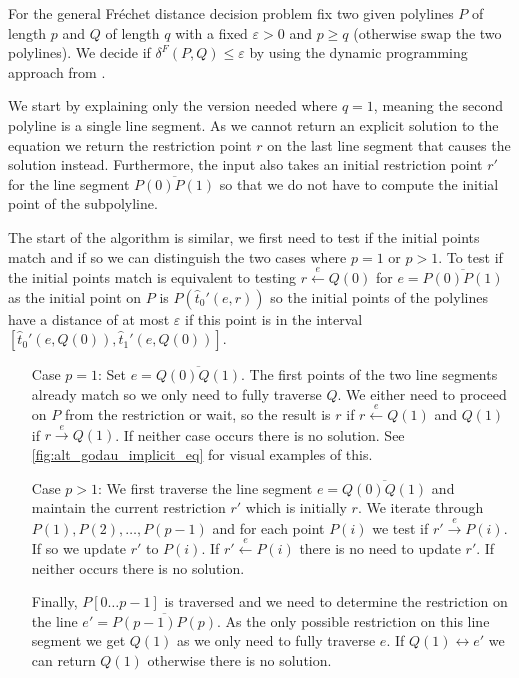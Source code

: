For the general Fréchet distance decision problem fix two given polylines \(P\) of length \(p\) and \(Q\) of length \(q\) with a fixed \(\varepsilon > 0\) and \(p \geq q\) (otherwise swap the two polylines). We decide if \(\delta^F(P, Q) \leq \varepsilon\) by using the dynamic programming approach from \citeauthor{computing_the_frechet_distance_between_two_polygonal_curves}. 

We start by explaining only the version needed where \(q = 1\), meaning the second polyline is a single line segment. As we cannot return an explicit solution to the equation we return the restriction point \(r\) on the last line segment that causes the solution instead. Furthermore, the input also takes an initial restriction point \(r'\) for the line segment \(\overline{P(0)P(1)}\) so that we do not have to compute the initial point of the subpolyline. 

The start of the algorithm is similar, we first need to test if the initial points match and if so we can distinguish the two cases where \(p = 1\) or \(p > 1\). To test if the initial points match is equivalent to testing \(r \overset e\leftarrow Q(0)\) for \(e = \overline{P(0)P(1)}\) as the initial point on \(P\) is \(P(\hat t_0'(e, r))\) so the initial points of the polylines have a distance of at most \(\varepsilon\) if this point is in the interval \([\hat t_0'(e, Q(0)), \hat t_1'(e, Q(0))]\).

\begin{itemize}
  \item[Case \(p = 1\): ] Set \(e = \overline{Q(0)Q(1)}\). The first points of the two line segments already match so we only need to fully traverse \(Q\). We either need to proceed on \(P\) from the restriction or wait, so the result is \(r\) if \(r \overset e\leftarrow Q(1)\) and \(Q(1)\) if \(r \overset e\rightarrow Q(1)\). If neither case occurs there is no solution. 
    See \cref{fig:alt_godau_implicit_eq} for visual examples of this.
  \item[Case \(p > 1\): ] We first traverse the line segment \(e = \overline{Q(0)Q(1)}\) and maintain the current restriction \(r'\) which is initially \(r\). We iterate through \(P(1), P(2), \dots, P(p-1)\) and for each point \(P(i)\) we test if \(r' \overset e\rightarrow P(i)\). If so we update \(r'\) to \(P(i)\). If \(r' \overset e\leftarrow P(i)\) there is no need to update \(r'\). If neither occurs there is no solution. 

    Finally, \(P[0\dots p-1]\) is traversed and we need to determine the restriction on the line \(e'=\overline{P(p-1)P(p)}\). As the only possible restriction on this line segment we get \(Q(1)\) as we only need to fully traverse \(e\). If \(Q(1) \leftrightarrow e'\) we can return \(Q(1)\) otherwise there is no solution.
\end{itemize}

